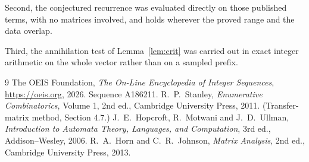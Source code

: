 \documentclass[11pt,a4paper]{article}
\theoremstyle{plain}
\theoremstyle{definition}
\begin{document}
Second, the conjectured recurrence was evaluated directly on those published terms, with no
matrices involved, and holds wherever the proved range and the data overlap.

Third, the annihilation test of Lemma~\ref{lem:crit} was carried out in exact integer
arithmetic on the whole vector rather than on a sampled prefix.

\begin{thebibliography}{9}
 The OEIS Foundation, \emph{The On-Line Encyclopedia of Integer
Sequences}, \url{https://oeis.org}, 2026. Sequence A186211.
 R.~P.~Stanley, \emph{Enumerative Combinatorics}, Volume 1, 2nd ed.,
Cambridge University Press, 2011. (Transfer-matrix method, Section 4.7.)
 J.~E.~Hopcroft, R.~Motwani and J.~D.~Ullman, \emph{Introduction to Automata
Theory, Languages, and Computation}, 3rd ed., Addison--Wesley, 2006.
 R.~A.~Horn and C.~R.~Johnson, \emph{Matrix Analysis}, 2nd ed., Cambridge
University Press, 2013.
\end{thebibliography}
\end{document}
